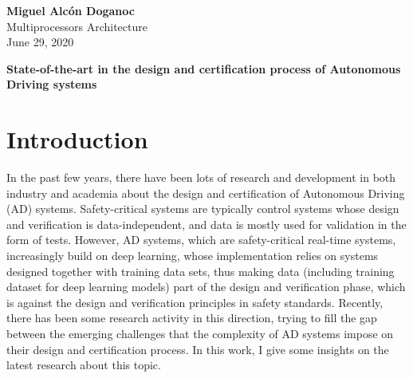 \documentclass[a4paper, 10pt]{article}
\begin{document}
\noindent
\begin{flushright}
	\large\textbf{Miguel Alcón Doganoc} \\
	Multiprocessors Architecture \\
	June 29, 2020
\end{flushright}
\vspace{10mm}
\noindent
{\huge{\textbf{State-of-the-art in the design and certification process of Autonomous Driving systems}}}
\section{Introduction}
In the past few years, there have been lots of research and development in both industry and academia about the design and certification of Autonomous Driving (AD) systems. Safety-critical systems are typically control systems whose design and verification is data-independent, and data is mostly used for validation in the form of tests. However, AD systems, which are safety-critical real-time systems, increasingly build on deep learning, whose implementation relies on systems designed together with training data sets, thus making data (including training dataset for deep learning models) part of the design and verification phase, which is against the design and verification principles in safety standards. Recently, there has been some research activity in this direction, trying to fill the gap between the emerging challenges that the complexity of AD systems impose on their design and certification process. In this work, I give some insights on the latest research about this topic.

\end{document}
